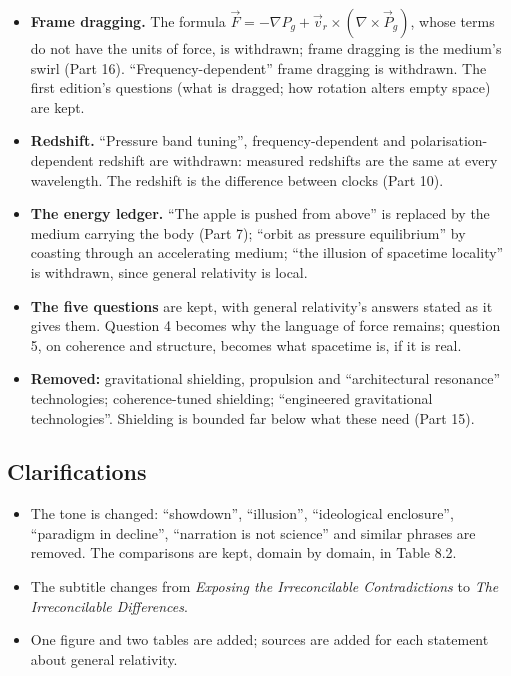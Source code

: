 \begin{itemize}
\item \textbf{Frame dragging.} The formula $\vec F = -\nabla P_g + \vec v_r \times (\nabla\times\vec P_g)$, whose terms do not have the units of force, is withdrawn; frame dragging is the medium's swirl (Part 16). ``Frequency-dependent'' frame dragging is withdrawn. The first edition's questions (what is dragged; how rotation alters empty space) are kept.
\item \textbf{Redshift.} ``Pressure band tuning'', frequency-dependent and polarisation-dependent redshift are withdrawn: measured redshifts are the same at every wavelength. The redshift is the difference between clocks (Part 10).
\item \textbf{The energy ledger.} ``The apple is pushed from above'' is replaced by the medium carrying the body (Part 7); ``orbit as pressure equilibrium'' by coasting through an accelerating medium; ``the illusion of spacetime locality'' is withdrawn, since general relativity is local.
\item \textbf{The five questions} are kept, with general relativity's answers stated as it gives them. Question 4 becomes why the language of force remains; question 5, on coherence and structure, becomes what spacetime is, if it is real.
\item \textbf{Removed:} gravitational shielding, propulsion and ``architectural resonance'' technologies; coherence-tuned shielding; ``engineered gravitational technologies''. Shielding is bounded far below what these need (Part 15).
\end{itemize}

\subsection*{Clarifications}
\begin{itemize}
\item The tone is changed: ``showdown'', ``illusion'', ``ideological enclosure'', ``paradigm in decline'', ``narration is not science'' and similar phrases are removed. The comparisons are kept, domain by domain, in Table 8.2.
\item The subtitle changes from \textit{Exposing the Irreconcilable Contradictions} to \textit{The Irreconcilable Differences}.
\item One figure and two tables are added; sources are added for each statement about general relativity.
\end{itemize}



